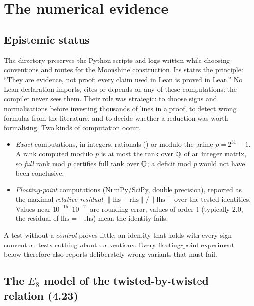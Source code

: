 \section{The numerical evidence}\label{ch15:sec:numerics}

\subsection{Epistemic status}

The directory  preserves the Python scripts and logs written
while choosing conventions and routes for the Moonshine construction. Its  states
the principle: ``They are evidence, not proof; every claim used in Lean is proved in Lean.'' No
Lean declaration imports, cites or depends on any of these computations; the compiler never sees
them. Their role was strategic: to choose signs and normalisations before investing thousands of
lines in a proof, to detect wrong formulas from the literature, and to decide whether a reduction
was worth formalising. Two kinds of computation occur.
\begin{itemize}
\item \emph{Exact} computations, in integers, rationals () or modulo the
  prime $p=2^{31}-1$. A rank computed modulo $p$ is at most the rank over ${\mathbb{Q}}$ of an integer matrix,
  so \emph{full} rank mod $p$ certifies full rank over ${\mathbb{Q}}$; a deficit mod $p$ would not have been
  conclusive.
\item \emph{Floating-point} computations (NumPy/SciPy, double precision), reported as the maximal
  \emph{relative residual} $\|\mathrm{lhs}-\mathrm{rhs}\|/\|\mathrm{lhs}\|$ over the tested identities.
  Values near $10^{-15}$--$10^{-11}$ are rounding error; values of order $1$ (typically $2.0$, the
  residual of $\mathrm{lhs}=-\mathrm{rhs}$) mean the identity fails.
\end{itemize}
A test without a \emph{control} proves little: an identity that holds with every sign convention
tests nothing about conventions. Every floating-point experiment below therefore also reports
deliberately wrong variants that must fail.

\subsection{The \texorpdfstring{$E_8$}{E8} model of the twisted-by-twisted relation (4.23)}\label{ch15:sec:num-e8}


